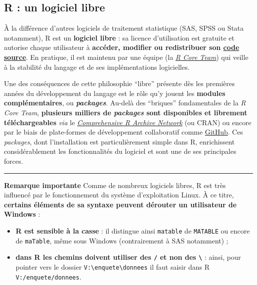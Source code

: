\documentclass[12pt,twosided, notitlepage]{book}
\providecommand{\tightlist}{%
  \setlength{\itemsep}{0pt}\setlength{\parskip}{0pt}}
\begin{document}
\subsection{R : un logiciel libre}\label{r-un-logiciel-libre}

À la différence d'autres logiciels de traitement statistique (SAS, SPSS
ou Stata notamment), R est un \textbf{logiciel libre} : sa licence
d'utilisation est gratuite et autorise chaque utilisateur à
\textbf{accéder, modifier ou redistribuer son
\href{https://github.com/wch/r-source}{code source}}. En pratique, il
est maintenu par une équipe (la
\emph{\href{https://www.r-project.org/contributors.html}{R Core Team}})
qui veille à la stabilité du langage et de ses implémentations
logicielles.

Une des conséquences de cette philosophie \enquote{libre} présente dès
les premières années du développement du langage est le rôle qu'y jouent
les \textbf{modules complémentaires}, ou \textbf{\emph{packages}}.
Au-delà des \enquote{briques} fondamentales de la \emph{R Core Team},
\textbf{plusieurs milliers de \emph{packages} sont disponibles et
librement téléchargeables} \emph{via} le
\href{https://cran.r-project.org/}{\emph{Comprehensive R Archive
Network}} (ou CRAN) ou encore par le biais de plate-formes de
développement collaboratif comme \href{https://github.com/}{GitHub}. Ces
\emph{packages}, dont l'installation est particulièrement simple dans R,
enrichissent considérablement les fonctionnalités du logiciel et sont
une de ses principales forces.

\begin{center}\rule{0.5\linewidth}{\linethickness}\end{center}

\textbf{Remarque importante} Comme de nombreux logiciels libres, R est
très influencé par le fonctionnement du système d'exploitation Linux. À
ce titre, \textbf{certains éléments de sa syntaxe peuvent dérouter un
utilisateur de Windows} :

\begin{itemize}
\tightlist
\item
  \textbf{R est sensible à la casse} : il distingue ainsi
  \texttt{matable} de \texttt{MATABLE} ou encore de \texttt{maTable},
  même sous Windows (contrairement à SAS notamment) ;
\item
  \textbf{dans R les chemins doivent utiliser des \texttt{/} et non des
  \texttt{\textbackslash{}}} : ainsi, pour pointer vers le dossier
  \texttt{V:\textbackslash{}enquete\textbackslash{}donnees} il faut
  saisir dans R \texttt{V:/enquete/donnees}.
\end{itemize}
\end{document}
